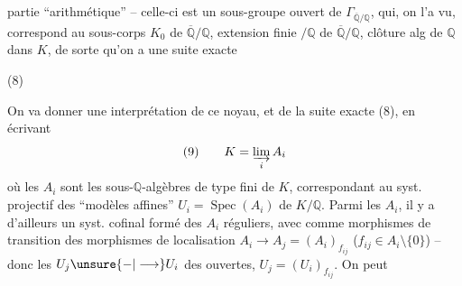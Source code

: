 partie ``arithmétique'' -- celle-ci est un sous-groupe ouvert de $\Gamma_{\overline{\mathbb Q}/\mathbb Q}$, qui, on l'a vu, correspond au sous-corps $K_0$ de $\overline{\mathbb Q}/\mathbb Q$, extension finie $/\mathbb Q$ de $\overline{\mathbb Q}/\mathbb Q$, clôture alg de $\mathbb Q$ dans $K$, de sorte qu'on a une suite exacte

\noindent (8)\quad{}

On va donner une interprétation de ce noyau, et de la suite exacte (8), en écrivant
\[
(9)\qquad K=\varinjlim_i A_i
\]
où les $A_i$ sont les sous-$\mathbb Q$-algèbres de type fini de $K$, correspondant au syst. projectif des ``modèles affines'' $U_i=\operatorname{Spec}(A_i)$ de $K/\mathbb Q$. Parmi les $A_i$, il y a d'ailleurs un syst. cofinal formé des $A_i$ réguliers,  avec comme morphismes de transition des morphismes de localisation $A_i\longrightarrow A_j=(A_i)_{f_{ij}}$ ($f_{ij}\in A_i\setminus\{0\}$) -- donc les $U_j\unsure{-|\longrightarrow}U_i$ des  ouvertes, $U_j=(U_i)_{f_{ij}}$. On peut
